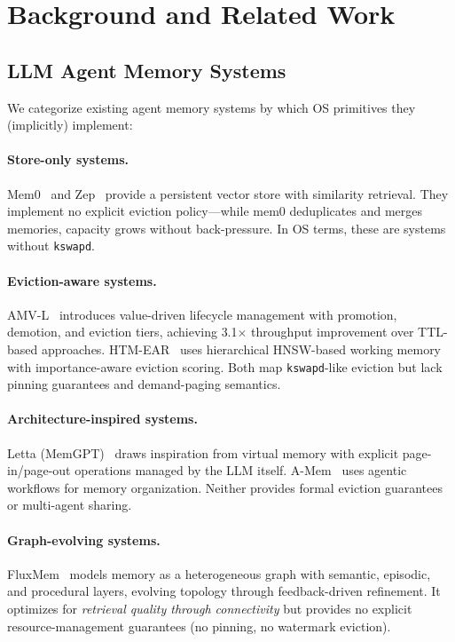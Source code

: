 \documentclass[10pt,twocolumn]{article}
\begin{document}
\section{Background and Related Work}
\label{sec:related}

\subsection{LLM Agent Memory Systems}

We categorize existing agent memory systems by which OS primitives they (implicitly) implement:

\paragraph{Store-only systems.} Mem0~\cite{mem0} and Zep~\cite{zep2024} provide a persistent vector store with similarity retrieval. They implement no explicit eviction policy---while mem0 deduplicates and merges memories, capacity grows without back-pressure. In OS terms, these are systems without \texttt{kswapd}.

\paragraph{Eviction-aware systems.} AMV-L~\cite{amvl2026} introduces value-driven lifecycle management with promotion, demotion, and eviction tiers, achieving 3.1$\times$ throughput improvement over TTL-based approaches. HTM-EAR~\cite{htmear2026} uses hierarchical HNSW-based working memory with importance-aware eviction scoring. Both map \texttt{kswapd}-like eviction but lack pinning guarantees and demand-paging semantics.

\paragraph{Architecture-inspired systems.} Letta (MemGPT)~\cite{memgpt2023} draws inspiration from virtual memory with explicit page-in/page-out operations managed by the LLM itself. A-Mem~\cite{amem2025} uses agentic workflows for memory organization. Neither provides formal eviction guarantees or multi-agent sharing.

\paragraph{Graph-evolving systems.} FluxMem~\cite{fluxmem2026} models memory as a heterogeneous graph with semantic, episodic, and procedural layers, evolving topology through feedback-driven refinement. It optimizes for \emph{retrieval quality through connectivity} but provides no explicit resource-management guarantees (no pinning, no watermark eviction).
\end{document}
